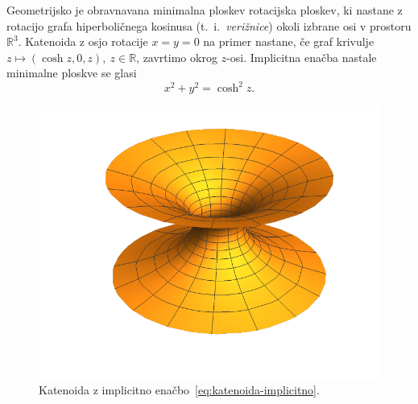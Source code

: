 \documentclass[12pt,a4paper,twoside]{article}
\theoremstyle{definition} %
\theoremstyle{plain} %
\numberwithin{equation}{section}  %
\begin{document}
Geometrijsko je obravnavana minimalna ploskev rotacijska ploskev, ki nastane z rotacijo grafa hiperboličnega kosinusa (t.~i.~\emph{verižnice}) okoli izbrane osi v prostoru $\mathbb{R}^3$. Katenoida z osjo rotacije $x=y=0$ na primer nastane, če graf krivulje $z \mapsto (\cosh z, 0, z), \ z \in \mathbb{R}$, zavrtimo okrog $z$-osi. Implicitna enačba nastale minimalne ploskve se glasi
\begin{equation} \label{eq:katenoida-implicitno}
x^2 + y^2 = \cosh ^2 z.
\end{equation}

\begin{figure}[h!]
\begin{center}
\includegraphics[scale=0.8]{images/catenoid.pdf}
\caption{Katenoida z implicitno enačbo~\eqref{eq:katenoida-implicitno}.}
\end{center}
\end{figure}
\end{document}
